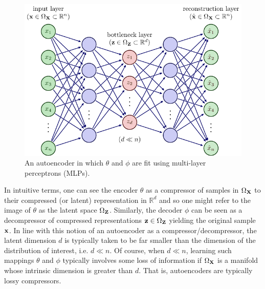 \documentclass[11pt]{article}
\begin{document}
\begin{figure}[ht]
    \centering
    \includegraphics{./figures/neural_nets/AE_autoencoder.pdf}
    \caption{An autoencoder in which $\theta$ and $\phi$ are fit using multi-layer perceptrons (MLPs).}
    \label{fig:autoencoder}
\end{figure}

In intuitive terms, one can see the encoder $\theta$ as a compressor of samples in $\Omega_{\mathbf{X}}$ to their compressed (or latent) representation in $\mathbb{R}^d$ and so one might refer to the image of $\theta$ as the latent space $\Omega_{\mathbf{Z}}$. Similarly, the decoder $\phi$ can be seen as a decompressor of compressed representations $\mathbf{z}\in\Omega_{\mathbf{Z}}$ yielding the original sample $\mathbf{x}$. In line with this notion of an autoencoder as a compressor/decompressor, the latent dimension $d$ is typically taken to be far smaller than the dimension of the distribution of interest, i.e. $d\ll n$. Of course, when $d\ll n$, learning such mappings $\theta$ and $\phi$ typically involves some loss of information if $\Omega_{\mathbf{X}}$ is a manifold whose intrinsic dimension is greater than $d$. That is, autoencoders are typically lossy compressors.
\end{document}
